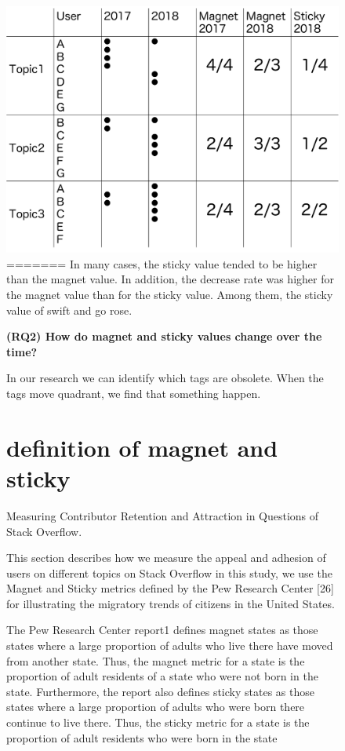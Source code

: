 \documentclass[conference]{IEEEtran}
\begin{document}
\begin{figure}[t]
 \centering
 \includegraphics[width=.9\hsize]{img/explainofMS.pdf}  
=======
In many cases, the sticky value tended to be higher than the magnet value. In addition, the decrease rate was higher for the magnet value than for the sticky value. Among them, the sticky value of swift and go rose.
\smallskip

\textbf{(RQ2) How do magnet and sticky values change over the time?}\par
In our research we can identify which tags are obsolete. When the tags move quadrant, we find that something happen.

\section{definition of magnet and sticky}
Measuring Contributor Retention and Attraction in Questions of Stack Overflow.

This section describes how we measure the appeal and adhesion of users on different topics on Stack Overflow in this study, we use the Magnet and Sticky metrics defined by the Pew Research Center [26] for illustrating the migratory trends of citizens in the United States.

The Pew Research Center report1 defines magnet states as those states where a large proportion of adults who live there have moved from another state. Thus, the magnet metric for a state is the proportion of adult residents of a state who were not born in the state. Furthermore, the report also defines sticky states as those states where a large proportion of adults who were born there continue to live there. Thus, the sticky metric for a state is the proportion of adult residents who were born in the state


\end{figure}
\end{document}
